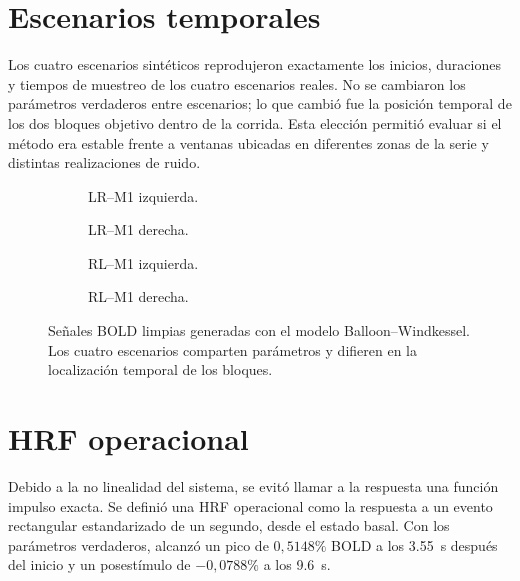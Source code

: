 \section{Escenarios temporales}
Los cuatro escenarios sintéticos reprodujeron exactamente los inicios, duraciones y tiempos de muestreo de los cuatro escenarios reales. No se cambiaron los parámetros verdaderos entre escenarios; lo que cambió fue la posición temporal de los dos bloques objetivo dentro de la corrida. Esta elección permitió evaluar si el método era estable frente a ventanas ubicadas en diferentes zonas de la serie y distintas realizaciones de ruido.

\begin{figure}[H]
\centering
\begin{subfigure}[t]{0.49\textwidth}
\caption{LR--M1 izquierda.}
\end{subfigure}\hfill
\begin{subfigure}[t]{0.49\textwidth}
\caption{LR--M1 derecha.}
\end{subfigure}
\vspace{0.4em}
\begin{subfigure}[t]{0.49\textwidth}
\caption{RL--M1 izquierda.}
\end{subfigure}\hfill
\begin{subfigure}[t]{0.49\textwidth}
\caption{RL--M1 derecha.}
\end{subfigure}
\caption{Señales BOLD limpias generadas con el modelo Balloon--Windkessel. Los cuatro escenarios comparten parámetros y difieren en la localización temporal de los bloques.}
\label{fig:synthetic_clean}
\end{figure}

\section{HRF operacional}
Debido a la no linealidad del sistema, se evitó llamar a la respuesta una función impulso exacta. Se definió una HRF operacional como la respuesta a un evento rectangular estandarizado de un segundo, desde el estado basal. Con los parámetros verdaderos, alcanzó un pico de $0{,}5148\%$ BOLD a los \SI{3.55}{s} después del inicio y un posestímulo de $-0{,}0788\%$ a los \SI{9.6}{s}.

